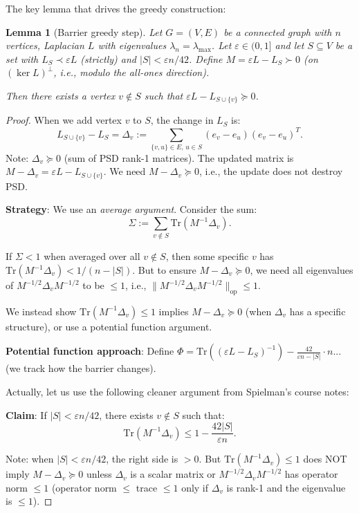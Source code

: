 \documentclass[12pt]{article}
\newtheorem{lemma}{Lemma}
\theoremstyle{definition}
\begin{document}
The key lemma that drives the greedy construction:

\begin{lemma}[Barrier greedy step]\label{lem:barrier}
Let $G = (V,E)$ be a connected graph with $n$ vertices, Laplacian $L$ with eigenvalues $\lambda_n = \lambda_{\max}$. Let $\varepsilon \in (0,1]$ and let $S \subseteq V$ be a set with $L_{S} \prec \varepsilon L$ (strictly) and $|S| < \varepsilon n/42$. Define $M = \varepsilon L - L_S \succ 0$ (on $(\ker L)^\perp$, i.e., modulo the all-ones direction).

Then there exists a vertex $v \notin S$ such that $\varepsilon L - L_{S \cup \{v\}} \succeq 0$.
\end{lemma}

\begin{proof}
When we add vertex $v$ to $S$, the change in $L_S$ is:
$$L_{S\cup\{v\}} - L_S = \Delta_v := \sum_{\{v,u\} \in E,\, u \in S} (e_v - e_u)(e_v - e_u)^T.$$
Note: $\Delta_v \succeq 0$ (sum of PSD rank-1 matrices). The updated matrix is $M - \Delta_v = \varepsilon L - L_{S\cup\{v\}}$. We need $M - \Delta_v \succeq 0$, i.e., the update does not destroy PSD.

\textbf{Strategy}: We use an \emph{average argument}. Consider the sum:
$$\Sigma := \sum_{v \notin S} \mathrm{Tr}(M^{-1}\Delta_v).$$

If $\Sigma < 1$ when averaged over all $v \notin S$, then some specific $v$ has $\mathrm{Tr}(M^{-1}\Delta_v) < 1/(n-|S|)$. But to ensure $M - \Delta_v \succeq 0$, we need all eigenvalues of $M^{-1/2}\Delta_v M^{-1/2}$ to be $\leq 1$, i.e., $\|M^{-1/2}\Delta_v M^{-1/2}\|_{\mathrm{op}} \leq 1$.

We instead show $\mathrm{Tr}(M^{-1}\Delta_v) \leq 1$ implies $M - \Delta_v \succeq 0$ (when $\Delta_v$ has a specific structure), or use a potential function argument.

\textbf{Potential function approach}: Define $\Phi = \mathrm{Tr}((\varepsilon L - L_S)^{-1}) - \frac{42}{\varepsilon n - |S|} \cdot n$... (we track how the barrier changes).

Actually, let us use the following cleaner argument from Spielman's course notes:

\textbf{Claim}: If $|S| < \varepsilon n/42$, there exists $v \notin S$ such that:
$$\mathrm{Tr}(M^{-1}\Delta_v) \leq 1 - \frac{42|S|}{\varepsilon n}.$$

Note: when $|S| < \varepsilon n/42$, the right side is $> 0$. But $\mathrm{Tr}(M^{-1}\Delta_v) \leq 1$ does NOT imply $M - \Delta_v \succeq 0$ unless $\Delta_v$ is a scalar matrix or $M^{-1/2}\Delta_v M^{-1/2}$ has operator norm $\leq 1$ (operator norm $\leq$ trace $\leq 1$ only if $\Delta_v$ is rank-1 and the eigenvalue is $\leq 1$).


\end{proof}
\end{document}
